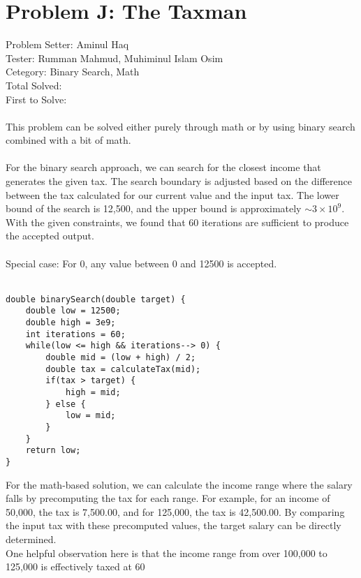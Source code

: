 \section*{Problem J: The Taxman}
Problem Setter: Aminul Haq \\
Tester: Rumman Mahmud,  Muhiminul Islam Osim \\
Cetegory: Binary Search, Math \\
Total Solved:  \\
First to Solve: \\
\\
This problem can be solved either purely through math or by using binary search combined with a bit of math. \\
\\
For the binary search approach, we can search for the closest income that generates the given tax. The search boundary is adjusted based on the difference between the tax calculated for our current value and the input tax. The lower bound of the search is 12,500, and the upper bound is approximately \(\sim 3 \times 10^9\). With the given constraints, we found that 60 iterations are sufficient to produce the accepted output.\\
\\
Special case: For 0, any value between 0 and 12500 is accepted.\\
\\
\begin{verbatim}
double binarySearch(double target) {
    double low = 12500;
    double high = 3e9;
    int iterations = 60;
    while(low <= high && iterations--> 0) {
        double mid = (low + high) / 2;
        double tax = calculateTax(mid);
        if(tax > target) {
            high = mid;
        } else {
            low = mid;
        }
    }
    return low;
}
\end{verbatim}

For the math-based solution, we can calculate the income range where the salary falls by precomputing the tax for each range. For example, for an income of 50,000, the tax is 7,500.00, and for 125,000, the tax is 42,500.00. By comparing the input tax with these precomputed values, the target salary can be directly determined.\\
One helpful observation here is that the income range from over 100,000 to 125,000 is effectively taxed at 60%
\\
